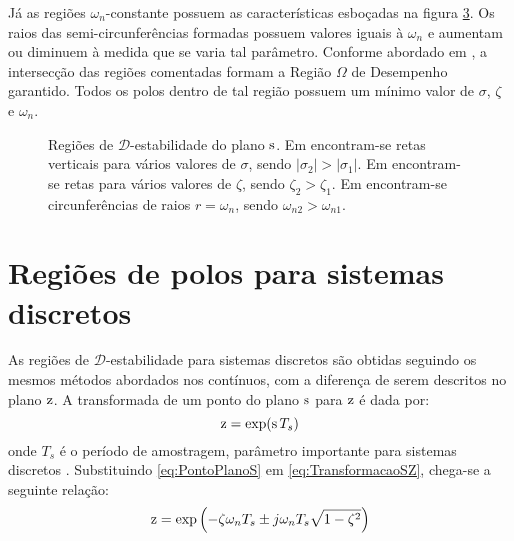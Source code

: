 Já as regiões $\omega_n$-constante possuem as características esboçadas na figura \ref{subfig:OscilacaoNaoAmortecidaS}. Os raios das semi-circunferências formadas possuem valores iguais à $\omega_n$ e aumentam ou diminuem à medida que se varia tal parâmetro. Conforme abordado em \cite{CHILALI1996}, a intersecção das regiões comentadas formam a Região $\Omega$ de Desempenho garantido. Todos os polos dentro de tal região possuem um mínimo valor de $\sigma$, $\zeta$ e $\omega_n$.

\begin{figure}[!hb]
  \centering
  \begin{subfigure}[t]{0.3\columnwidth}
      
      \caption{}
      \label{subfig:EstabilidadeRelativaS}
  \end{subfigure}
  \begin{subfigure}[t]{0.3\columnwidth}
      
      \caption{}
      \label{subfig:TaxaDeAmortecimentoS}
  \end{subfigure}
  \begin{subfigure}[t]{0.35\columnwidth}
    
    \caption{}
    \label{subfig:OscilacaoNaoAmortecidaS}
  \end{subfigure}
  \caption{Regiões de $\mathscr{D}$-estabilidade do plano $\operatorname{\mathrm{s}}$. Em  encontram-se retas verticais para vários valores de $\sigma$, sendo $|\sigma_2| > |\sigma_1|$. Em  encontram-se retas para vários valores de $\zeta$, sendo $\zeta_2 > \zeta_1$. Em  encontram-se circunferências de raios $r = \omega_n$, sendo $\omega_{n2} > \omega_{n1}$.}
  \label{fig:RegioesPlanoS}
\end{figure}

\section{Regiões de polos para sistemas discretos}\label{sec:DEstabilidadeZ}

As regiões de $\mathscr{D}$-estabilidade para sistemas discretos são obtidas seguindo os mesmos métodos abordados nos contínuos, com a diferença de serem descritos no plano $\operatorname{\mathrm{z}}$. A transformada de um ponto do plano $\operatorname{\mathrm{s}}$ para $\operatorname{\mathrm{z}}$ é dada por:
\begin{equation}
  \operatorname{\mathrm{z}} = \exp(\operatorname{\mathrm{s}} T_s)\label{eq:TransformacaoSZ}
\end{equation}
onde $T_s$ é o período de amostragem, parâmetro importante para sistemas discretos \cite{KUO1980}. Substituindo \eqref{eq:PontoPlanoS} em \eqref{eq:TransformacaoSZ}, chega-se a seguinte relação:
\begin{equation}
  \operatorname{\mathrm{z}} = \exp{\left(-\zeta\omega_nT_s \pm j\omega_nT_s\sqrt{1-\zeta^2}\right)}\label{eq:PontoPlanoZ}
\end{equation}

